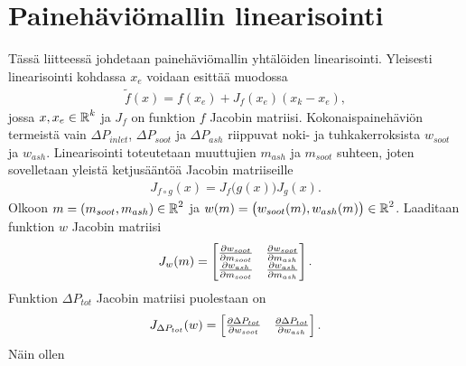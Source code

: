 
\chapter{Painehäviömallin linearisointi}%
\label{ch:dP_linearisointi}

Tässä liitteessä johdetaan painehäviömallin yhtälöiden linearisointi. Yleisesti linearisointi kohdassa \(x_e\) voidaan esittää muodossa
\begin{align}
    \tilde{f}(x) = f(x_e) +J_f (x_e) (x_k-x_e),
\end{align}
jossa \(x, x_e \in \operatorname{\mathbb{R}}^k\) ja \(J_f\) on funktion \(f\) Jacobin matriisi. 
Kokonaispainehäviön termeistä vain \(\Delta P_{inlet}\), \(\Delta P_{soot}\) ja \(\Delta P_{ash}\) riippuvat noki- ja tuhkakerroksista \(w_{soot}\) ja \(w_{ash}\). 
Linearisointi toteutetaan muuttujien \(m_{ash}\) ja \( m_{soot}\) suhteen, joten
sovelletaan yleistä ketjusääntöä Jacobin matriiseille
\begin{align}
    J_{f \circ g}(x) = J_f\big(g(x)\big)  J_g(x).
\end{align}
Olkoon \(m = \left(m_{soot}, m_{ash}\right) \in \operatorname{\mathbb{R}}^2\) ja \(w(m) = \big(w_{soot}(m), w_{ash}(m)  \big) \in \operatorname{\mathbb{R}}^2\). Laaditaan funktion \(w\) Jacobin matriisi
\begin{align}
    J_w(m)=
    \begin{bmatrix} 
        \frac{\partial w_{soot}}{\partial m_{soot}}
        & 
        \frac{\partial w_{soot}}{\partial m_{ash}} 
        \\  
        \frac{\partial w_{ash}}{\partial m_{soot}}
        & 
        \frac{\partial w_{ash}}{\partial m_{ash}} 
     \end{bmatrix}.
\end{align}
 Funktion \(\Delta P_{tot}\) Jacobin matriisi puolestaan on 
\begin{align}
    J_{\Delta P_{tot}}(w) = \begin{bmatrix}   
        \frac{\partial \Delta P_{tot}}{\partial w_{soot}}
        &   
        \frac{\partial \Delta P_{tot}}{\partial w_{ash}}
     \end{bmatrix}.
\end{align}
Näin ollen 
